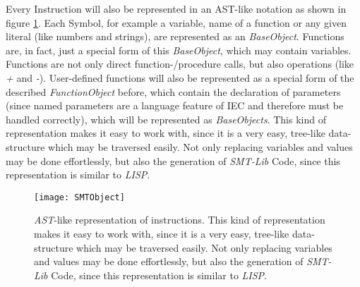 Every Instruction will also be represented in an AST-like notation as shown in figure \ref{fig:smtobject}. Each Symbol, for example a variable, name of a function or any given literal (like numbers and strings), are represented as an \emph{BaseObject}. Functions are, in fact, just a special form of this \emph{BaseObject}, which may contain variables. Functions are not only direct function-/procedure calls, but also operations (like \emph{+} and \emph{-}). User-defined functions will also be represented as a special form of the described \emph{FunctionObject} before, which contain the declaration of parameters (since named parameters are a language feature of IEC and therefore must be handled correctly), which will be represented as \emph{BaseObjects}. 
This kind of representation makes it easy to work with, since it is a very easy, tree-like data-structure which may be traversed easily. Not only replacing variables and values may be done effortlessly, but also the generation of \emph{SMT-Lib} Code, since this representation is similar to \emph{LISP}.

\begin{figure}[h!]
	\centering
	\texttt{[image: SMTObject]}
	\caption{\emph{AST}-like representation of instructions. This kind of representation makes it easy to work with, since it is a very easy, tree-like data-structure which may be traversed easily. Not only replacing variables and values may be done effortlessly, but also the generation of \emph{SMT-Lib} Code, since this representation is similar to \emph{LISP}.}
	\label{fig:smtobject}
\end{figure}
